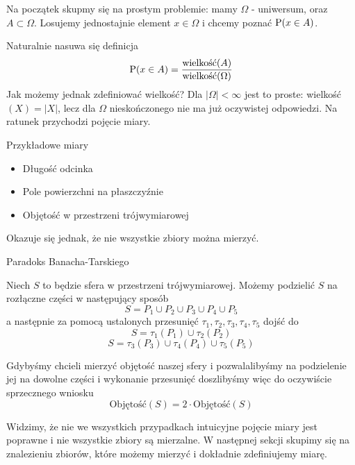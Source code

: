 Na początek skupmy się na prostym problemie: mamy \(\Omega\) - uniwersum, oraz \(A \subset \Omega\). Losujemy jednostajnie element \(x \in \Omega\) i chcemy poznać \(\operatorname{P}(x \in A)\).

Naturalnie nasuwa się definicja
\[
	\operatorname{P}(x \in A) = \frac{\text{wielkość}(A)}{\text{wielkość}(\Omega)}
\]
Jak możemy jednak zdefiniować wielkość? Dla \(|\Omega| < \infty\) jest to proste: wielkość\((X) = |X|\), lecz dla \(\Omega\) nieskończonego nie ma już oczywistej odpowiedzi. Na ratunek przychodzi pojęcie miary.

\begin{example} Przykładowe miary
	\begin{itemize}
		\item Długość odcinka
		\item Pole powierzchni na płaszczyźnie
		\item Objętość w przestrzeni trójwymiarowej
	\end{itemize}
\end{example}

Okazuje się jednak, że nie wszystkie zbiory można mierzyć.
\begin{example}
	Paradoks Banacha-Tarskiego
	
	Niech \(S\) to będzie sfera w przestrzeni trójwymiarowej. Możemy podzielić \(S\) na rozłączne części w następujący sposób
	\[
		S = P_1 \cup P_2 \cup P_3 \cup P_4 \cup P_5
	\]
	a następnie za pomocą ustalonych przesunięć \(\tau_1, \tau_2, \tau_3, \tau_4, \tau_5\) dojść do
	\[
		S = \tau_1(P_1) \cup \tau_2(P_2)
	\]
	\[
		S = \tau_3(P_3) \cup \tau_4(P_4) \cup \tau_5(P_5)
	\]
	
	Gdybyśmy chcieli mierzyć objętość naszej sfery i pozwalalibyśmy na podzielenie jej na dowolne części i wykonanie przesunięć doszlibyśmy więc do oczywiście sprzecznego wniosku
	\[
		\text{Objętość}(S) = 2 \cdot \text{Objętość}(S) 
	\]
\end{example}

Widzimy, że nie we wszystkich przypadkach intuicyjne pojęcie miary jest poprawne i nie wszystkie zbiory są mierzalne. W następnej sekcji skupimy się na znalezieniu zbiorów, które możemy mierzyć i dokładnie zdefiniujemy miarę.